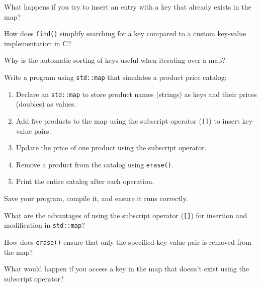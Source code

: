 \begin{challenge}
\begin{task}
        \begin{questions}
            \item What happens if you try to insert an entry with a key that already exists in the map?
            \item How does \texttt{find()} simplify searching for a key compared to a custom key-value implementation in C?
            \item Why is the automatic sorting of keys useful when iterating over a map?
        \end{questions}
    \end{task}

    \begin{task}
        Write a program using \texttt{std::map} that simulates a product price catalog:
        \begin{enumerate}
            \item Declare an \texttt{std::map} to store product names (strings) as keys and their prices (doubles) as values.
            \item Add five products to the map using the subscript operator (\texttt{[]}) to insert key-value pairs.
            \item Update the price of one product using the subscript operator.
            \item Remove a product from the catalog using \texttt{erase()}.
            \item Print the entire catalog after each operation.
        \end{enumerate}

        Save your program, compile it, and ensure it runs correctly.

        \begin{questions}
            \item What are the advantages of using the subscript operator (\texttt{[]}) for insertion and modification in \texttt{std::map}?
            \item How does \texttt{erase()} ensure that only the specified key-value pair is removed from the map?
            \item What would happen if you access a key in the map that doesn’t exist using the subscript operator?
        \end{questions}
    \end{task}


\end{challenge}
